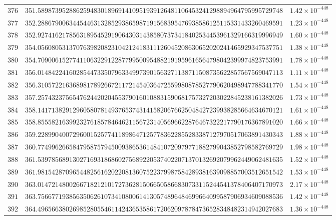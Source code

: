 \documentclass[12pt,reqno]{amsart}
\theoremstyle{remark}
\begin{document}
\begin{longtable}{clc}
$376$ & $351.5898739528862594830189691410951939126481106453241298894964795995729748$ & $1.42\times 10^{-448}$ \\
$377$ & $352.2886790063445446313285293865987191568395476938586125115331433260469591$ & $1.23\times 10^{-448}$ \\
$378$ & $352.9274162178563189545291906430314385807373418402534453961329166319996949$ & $1.60\times 10^{-448}$ \\
$379$ & $354.0560805313707639820823104212418311126045208630652020241465929347537751$ & $1.38\times 10^{-448}$ \\
$380$ & $354.7090061527741106322912287799500954882191959616564798042399974823753991$ & $1.78\times 10^{-448}$ \\
$381$ & $356.0148422416028544733507963349973901563271138711508735622857567569047113$ & $1.11\times 10^{-448}$ \\
$382$ & $356.3105722163689817892667211721454036472559980878527790620498947788341770$ & $1.54\times 10^{-448}$ \\
$383$ & $357.2574323756547624420204553790160108831590681757327203022845238161382026$ & $1.73\times 10^{-448}$ \\
$384$ & $358.1417138291296058078149376537431415820676625048427239938285664634670121$ & $1.61\times 10^{-448}$ \\
$385$ & $358.8555821639923276185784646211567231405696622876467322217790176367891020$ & $1.66\times 10^{-448}$ \\
$386$ & $359.2289904007296001525774118986471257783622855283387127970517063891430343$ & $1.88\times 10^{-448}$ \\
$387$ & $360.7749962665847958757945009386536148410720979771882799043852798582769729$ & $1.98\times 10^{-448}$ \\
$388$ & $361.5397856891302716931868602756892205374022071370132692079962449062481635$ & $1.52\times 10^{-448}$ \\
$389$ & $361.9815428709654482561620220813607522379987584289381639098857003512651542$ & $1.53\times 10^{-448}$ \\
$390$ & $363.0147214800266718212101727362815066505866830733115244541378406407170973$ & $2.17\times 10^{-448}$ \\
$391$ & $363.7566771938563506261073410800614130574896484699664099587906934609088536$ & $1.42\times 10^{-448}$ \\
$392$ & $364.4965663802698528055461142436535861720620978784736528348482314942027683$ & $1.36\times 10^{-448}$ \\

\end{longtable}
\end{document}
